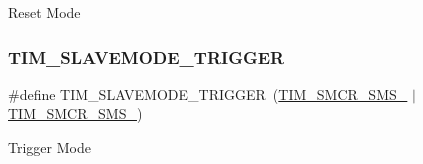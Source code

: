 Reset Mode \mbox{\label{group___t_i_m___slave___mode_ga12f8f7b4a16b438f54cf811f0bb0a8a4}} 
\subsubsection{\texorpdfstring{TIM\_SLAVEMODE\_TRIGGER}{TIM\_SLAVEMODE\_TRIGGER}}
{\footnotesize\ttfamily \#define T\+I\+M\+\_\+\+S\+L\+A\+V\+E\+M\+O\+D\+E\+\_\+\+T\+R\+I\+G\+G\+ER~(\mbox{\hyperlink{group___peripheral___registers___bits___definition_ga63847fc3c71f582403e6301b1229c3ed}{T\+I\+M\+\_\+\+S\+M\+C\+R\+\_\+\+S\+M\+S\+\_}} $\vert$ \mbox{\hyperlink{group___peripheral___registers___bits___definition_gaa980a3121ab6cda5a4a42b959da8421e}{T\+I\+M\+\_\+\+S\+M\+C\+R\+\_\+\+S\+M\+S\+\_}})}

Trigger Mode 